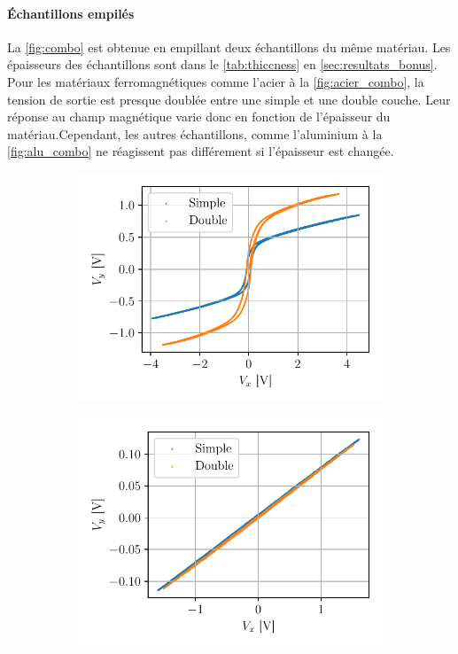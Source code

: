 \paragraph{Échantillons empilés}
La \autoref{fig:combo} est obtenue en empillant deux échantillons du même matériau. Les épaisseurs des échantillons sont dans le \autoref{tab:thiccness} en \autoref{sec:resultats_bonus}. Pour les matériaux ferromagnétiques comme l'acier à la \autoref{fig:acier_combo}, la tension de sortie est presque doublée entre une simple et une double couche. Leur réponse au champ magnétique varie donc en fonction de l'épaisseur du matériau.Cependant, les autres échantillons, comme l'aluminium à la \autoref{fig:alu_combo} ne réagissent pas différement si l'épaisseur est changée.

\begin{figure}[h]
    \centering
    \begin{subfigure}{0.5\linewidth}
        \centering
        \includegraphics[width=\linewidth]{figures/ac_doux_simple_vs_combo.pdf}
        \caption{}
        \label{fig:acier_combo}
    \end{subfigure}%
    \begin{subfigure}{0.5\linewidth}
        \centering
        \includegraphics[width=\linewidth]{figures/alu_simple_vs_combo.pdf}

\end{subfigure}
\end{figure}
